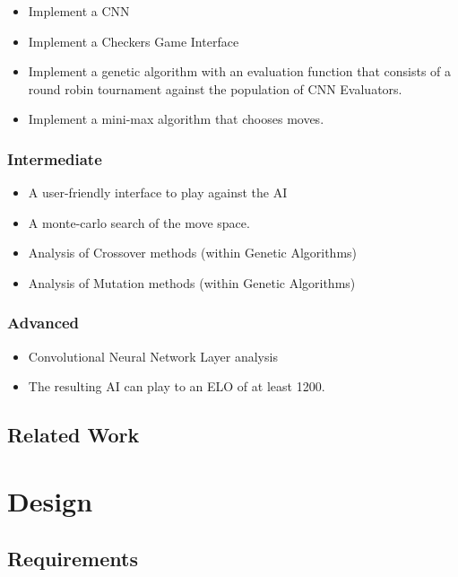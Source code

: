 \documentclass[12pt,a4paper]{article}
\begin{document}
\begin{itemize}
\item Implement a CNN
\item Implement a Checkers Game Interface
\item Implement a genetic algorithm with an evaluation function that
  consists of a round robin tournament against the population of CNN
  Evaluators.
\item Implement a mini-max algorithm that chooses moves.
\end{itemize}

\subsubsection*{Intermediate}

\begin{itemize}
\item A user-friendly interface to play against the AI
\item A monte-carlo search of the move space.
\item Analysis of Crossover methods (within Genetic Algorithms)
\item Analysis of Mutation methods (within Genetic Algorithms)
\end{itemize}

\subsubsection*{Advanced}

\begin{itemize}
\item Convolutional Neural Network Layer analysis
\item The resulting AI can play to an ELO of at least 1200.
\end{itemize}

\subsection*{Related Work}


\section{Design}

\subsection*{Requirements}
\end{document}
